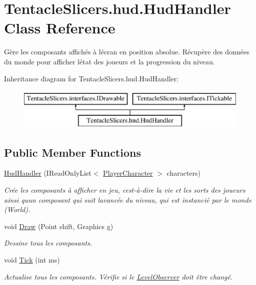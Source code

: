 \hypertarget{class_tentacle_slicers_1_1hud_1_1_hud_handler}{}\section{Tentacle\+Slicers.\+hud.\+Hud\+Handler Class Reference}
\label{class_tentacle_slicers_1_1hud_1_1_hud_handler}


Gère les composants affichés à l\textquotesingle{}écran en position absolue. Récupère des données du monde pour afficher l\textquotesingle{}état des joueurs et la progression du niveau.  


Inheritance diagram for Tentacle\+Slicers.\+hud.\+Hud\+Handler\+:\begin{figure}[H]
\begin{center}
\leavevmode
\includegraphics[height=2.000000cm]{class_tentacle_slicers_1_1hud_1_1_hud_handler}
\end{center}
\end{figure}
\subsection*{Public Member Functions}
\begin{DoxyCompactItemize}
\item 
\hyperlink{class_tentacle_slicers_1_1hud_1_1_hud_handler_a0566cbce018f4f281f7286dad1a76d34}{Hud\+Handler} (I\+Read\+Only\+List$<$ \hyperlink{class_tentacle_slicers_1_1actors_1_1_player_character}{Player\+Character} $>$ characters)
\begin{DoxyCompactList}\small\item\em Crée les composants à afficher en jeu, c\textquotesingle{}est-\/à-\/dire la vie et les sorts des joueurs ainsi qu\textquotesingle{}un composant qui suit l\textquotesingle{}avancée du niveau, qui est instancié par le monde (World). \end{DoxyCompactList}\item 
void \hyperlink{class_tentacle_slicers_1_1hud_1_1_hud_handler_a61718275f1f7d9a57d63a6b5588737f8}{Draw} (Point shift, Graphics g)
\begin{DoxyCompactList}\small\item\em Dessine tous les composants. \end{DoxyCompactList}\item 
void \hyperlink{class_tentacle_slicers_1_1hud_1_1_hud_handler_a3786a79f72b2f65630ca61363dcd3246}{Tick} (int ms)
\begin{DoxyCompactList}\small\item\em Actualise tous les composants. Vérifie si le \hyperlink{class_tentacle_slicers_1_1hud_1_1_level_observer}{Level\+Observer} doit être changé. \end{DoxyCompactList}\end{DoxyCompactItemize}



